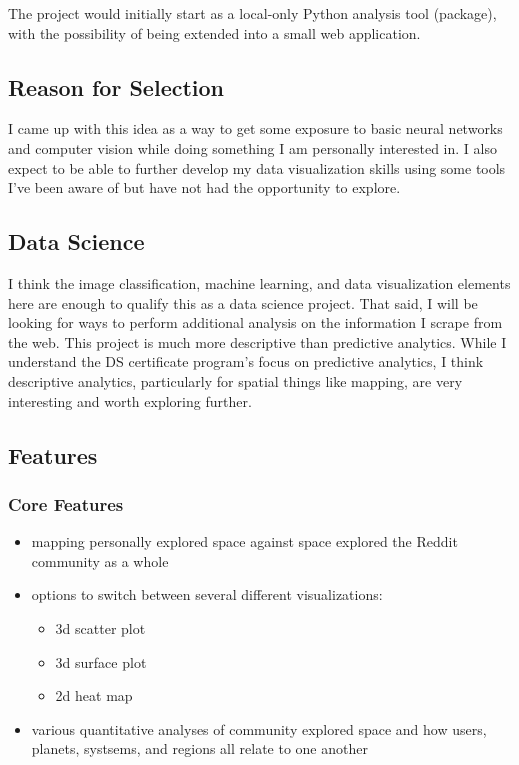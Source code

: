 \documentclass[
]{article}
\providecommand{\tightlist}{%
  \setlength{\itemsep}{0pt}\setlength{\parskip}{0pt}}
\begin{document}
The project would initially start as a local-only Python analysis tool
(package), with the possibility of being extended into a small web
application.

\hypertarget{reason-for-selection}{%
\subsection{Reason for Selection}\label{reason-for-selection}}

I came up with this idea as a way to get some exposure to basic neural
networks and computer vision while doing something I am personally
interested in. I also expect to be able to further develop my data
visualization skills using some tools I've been aware of but have not
had the opportunity to explore.

\hypertarget{data-science}{%
\subsection{Data Science}\label{data-science}}

I think the image classification, machine learning, and data
visualization elements here are enough to qualify this as a data science
project. That said, I will be looking for ways to perform additional
analysis on the information I scrape from the web. This project is much
more descriptive than predictive analytics. While I understand the DS
certificate program's focus on predictive analytics, I think descriptive
analytics, particularly for spatial things like mapping, are very
interesting and worth exploring further.

\pagebreak

\hypertarget{features}{%
\subsection{Features}\label{features}}

\hypertarget{core-features}{%
\subsubsection{Core Features}\label{core-features}}

\begin{itemize}
\tightlist
\item
  mapping personally explored space against space explored the Reddit
  community as a whole
\item
  options to switch between several different visualizations:

  \begin{itemize}
  \tightlist
  \item
    3d scatter plot
  \item
    3d surface plot\\
  \item
    2d heat map
  \end{itemize}
\item
  various quantitative analyses of community explored space and how
  users, planets, systsems, and regions all relate to one another
\end{itemize}
\end{document}
